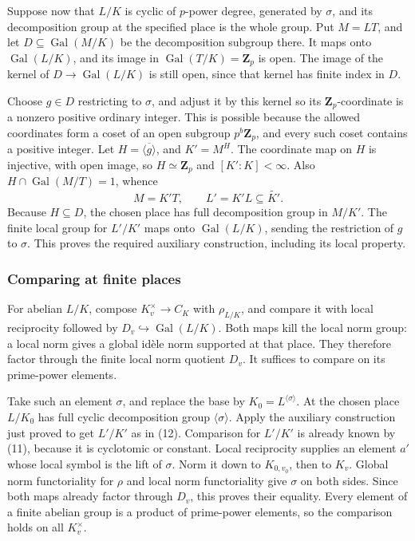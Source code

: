 \documentclass[11pt,a4paper]{article}
\begin{document}
Suppose now that \(L/K\) is cyclic of \(p\)-power degree, generated by
\(\sigma\), and its decomposition group at the specified place is the
whole group. Put \(M=LT\), and let \(D\subseteq\operatorname{Gal}(M/K)\)
be the decomposition subgroup there. It maps onto
\(\operatorname{Gal}(L/K)\), and its image in
\(\operatorname{Gal}(T/K)=\mathbf Z_p\) is open. The image of the kernel
of \(D\to\operatorname{Gal}(L/K)\) is still open, since that kernel has
finite index in \(D\).

Choose \(g\in D\) restricting to \(\sigma\), and adjust it by this
kernel so its \(\mathbf Z_p\)-coordinate is a nonzero positive ordinary
integer. This is possible because the allowed coordinates form a coset
of an open subgroup \(p^b\mathbf Z_p\), and every such coset contains a
positive integer. Let \(H=\overline{\langle g\rangle}\), and \(K'=M^H\).
The coordinate map on \(H\) is injective, with open image, so
\(H\simeq\mathbf Z_p\) and \([K':K]<\infty\). Also
\(H\cap\operatorname{Gal}(M/T)=1\), whence \[
M=K'T,\qquad L'=K'L\subseteq\widetilde{K'}.
\tag{12}
\] Because \(H\subseteq D\), the chosen place has full decomposition
group in \(M/K'\). The finite local group for \(L'/K'\) maps onto
\(\operatorname{Gal}(L/K)\), sending the restriction of \(g\) to
\(\sigma\). This proves the required auxiliary construction, including
its local property.

\subsubsection{Comparing at finite
places}\label{comparing-at-finite-places}

For abelian \(L/K\), compose \(K_v^\times\to C_K\) with \(\rho_{L/K}\),
and compare it with local reciprocity followed by
\(D_v\hookrightarrow\operatorname{Gal}(L/K)\). Both maps kill the local
norm group: a local norm gives a global idèle norm supported at that
place. They therefore factor through the finite local norm quotient
\(D_v\). It suffices to compare on its prime-power elements.

Take such an element \(\sigma\), and replace the base by
\(K_0=L^{\langle\sigma\rangle}\). At the chosen place \(L/K_0\) has full
cyclic decomposition group \(\langle\sigma\rangle\). Apply the auxiliary
construction just proved to get \(L'/K'\) as in (12). Comparison for
\(L'/K'\) is already known by (11), because it is cyclotomic or
constant. Local reciprocity supplies an element \(a'\) whose local
symbol is the lift of \(\sigma\). Norm it down to \(K_{0,v_0}\), then to
\(K_v\). Global norm functoriality for \(\rho\) and local norm
functoriality give \(\sigma\) on both sides. Since both maps already
factor through \(D_v\), this proves their equality. Every element of a
finite abelian group is a product of prime-power elements, so the
comparison holds on all \(K_v^\times\).
\end{document}
